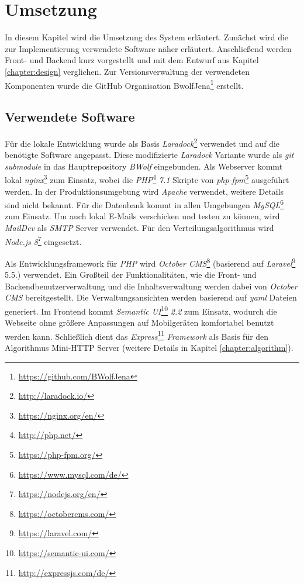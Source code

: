 \chapter{Umsetzung}
\label{chapter:implementation}
    In diesem Kapitel wird die Umsetzung des System erläutert.
    Zunächst wird die zur Implementierung verwendete Software näher erläutert.
    Anschließend werden Front- und Backend kurz vorgestellt und mit dem Entwurf aus Kapitel \ref{chapter:design} verglichen.
    Zur Versionsverwaltung der verwendeten Komponenten wurde die GitHub Organisation BwolfJena\footnote{\href{https://github.com/BWolfJena}{https://github.com/BWolfJena}} erstellt.
    
    \section{Verwendete Software}

        Für die lokale Entwicklung wurde als Basis \textit{Laradock}\footnote{\href{http://laradock.io/}{http://laradock.io/}} verwendet und auf die benötigte Software angepasst.
        Diese modifizierte \textit{Laradock} Variante wurde als \textit{git submodule} in das Hauptrepository \textit{BWolf} eingebunden.
        Als Webserver kommt lokal \textit{nginx}\footnote{\href{https://nginx.org/en/}{https://nginx.org/en/}} zum Einsatz, wobei die \textit{PHP}\footnote{\href{http://php.net/}{http://php.net/}} \textit{7.1} Skripte von \textit{php-fpm}\footnote{\href{https://php-fpm.org/}{https://php-fpm.org/}} ausgeführt werden.
        In der Produktionsumgebung wird \textit{Apache} verwendet, weitere Details sind nicht bekannt.
        Für die Datenbank kommt in allen Umgebungen \textit{MySQL}\footnote{\href{https://www.mysql.com/de/}{https://www.mysql.com/de/}} zum Einsatz.
        Um auch lokal E-Mails verschicken und testen zu können, wird \textit{MailDev} als \textit{SMTP} Server verwendet.
        Für den Verteilungsalgorithmus wird \textit{Node.js 8}\footnote{\href{https://nodejs.org/en/}{https://nodejs.org/en/}} eingesetzt.
        
        Als Entwicklungsframework für \textit{PHP} wird \textit{October CMS}\footnote{\href{https://octobercms.com/}{https://octobercms.com/}} (basierend auf \textit{Laravel}\footnote{\href{https://laravel.com/}{https://laravel.com/}} 5.5.) verwendet. 
        Ein Großteil der Funktionalitäten, wie die Front- und Backendbenutzerverwaltung und die Inhaltsverwaltung werden dabei von \textit{October CMS} bereitgestellt. 
        Die Verwaltungsansichten werden basierend auf \textit{yaml} Dateien generiert. 
        Im Frontend kommt \textit{Semantic UI}\footnote{\href{https://semantic-ui.com/}{https://semantic-ui.com/}} \textit{2.2} zum Einsatz, wodurch die Webseite ohne größere Anpassungen auf Mobilgeräten komfortabel benutzt werden kann. 
        Schließlich dient das \textit{Express}\footnote{\href{http://expressjs.com/de/}{http://expressjs.com/de/}} \textit{Framework} als Basis für den Algorithmus Mini-HTTP Server (weitere Details in Kapitel \ref{chapter:algorithm}).                
